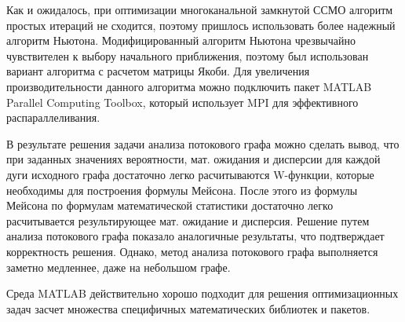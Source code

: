 Как и ожидалось, при оптимизации многоканальной замкнутой ССМО алгоритм простых итераций не сходится, поэтому пришлось использовать более надежный алгоритм Ньютона. Модифицированный алгоритм Ньютона чрезвычайно чувствителен к выбору начального приближения, поэтому был использован вариант алгоритма с расчетом матрицы Якоби. Для увеличения производительности данного алгоритма можно подключить пакет MATLAB Parallel Computing Toolbox, который использует MPI для эффективного распараллеливания.

В результате решения задачи анализа потокового графа можно сделать вывод, что при  заданных значениях вероятности, мат. ожидания и дисперсии для каждой дуги исходного графа достаточно легко расчитываются W-функции, которые необходимы для построения формулы Мейсона. После этого из формулы Мейсона по формулам математической статистики достаточно легко расчитывается результирующее мат. ожидание и дисперсия. Решение путем анализа потокового графа показало аналогичные результаты, что подтверждает корректность решения. Однако, метод анализа потокового графа выполняется заметно медленнее, даже на небольшом графе.

Среда MATLAB действительно хорошо подходит для решения оптимизационных задач засчет множества специфичных математических библиотек и пакетов.


%
%


